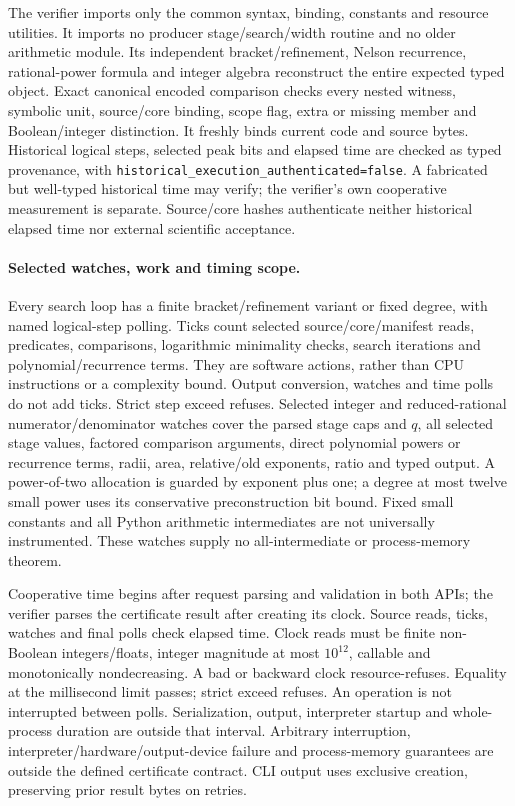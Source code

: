\documentclass[11pt]{article}
\theoremstyle{plain}
\theoremstyle{definition}
\theoremstyle{remark}
\begin{document}
The verifier imports only the common syntax, binding, constants and resource
utilities. It imports no producer stage/search/width routine and no older
arithmetic module. Its independent bracket/refinement, Nelson recurrence,
rational-power formula and integer algebra reconstruct the entire expected
typed object. Exact canonical encoded comparison checks every nested witness,
symbolic unit, source/core binding, scope flag, extra or missing member and
Boolean/integer distinction. It freshly binds current code and source bytes.
Historical logical steps, selected peak bits and elapsed time are checked as
typed provenance, with \texttt{historical\_execution\_authenticated=false}.
A fabricated but well-typed historical time may verify; the verifier's own
cooperative measurement is separate. Source/core hashes authenticate neither
historical elapsed time nor external scientific acceptance.

\paragraph{Selected watches, work and timing scope.}
Every search loop has a finite bracket/refinement variant or fixed degree,
with named logical-step polling. Ticks count selected source/core/manifest
reads, predicates, comparisons, logarithmic minimality checks, search
iterations and polynomial/recurrence terms. They are software actions,
rather than CPU instructions or a complexity bound. Output conversion,
watches and time polls do not add ticks. Strict step exceed refuses.
Selected integer and reduced-rational numerator/denominator watches cover
the parsed stage caps and $q$, all selected stage values, factored comparison
arguments, direct polynomial powers or recurrence terms, radii, area,
relative/old exponents, ratio and typed output. A power-of-two allocation is
guarded by exponent plus one; a degree at most twelve small power uses its
conservative preconstruction bit bound. Fixed small constants and all Python
arithmetic intermediates are not universally instrumented. These watches
supply no all-intermediate or process-memory theorem.

Cooperative time begins after request parsing and validation in both APIs;
the verifier parses the certificate result after creating its clock.
Source reads, ticks, watches and final polls check elapsed time. Clock reads
must be finite non-Boolean integers/floats, integer magnitude at most
$10^{12}$, callable and monotonically nondecreasing. A bad or backward clock
resource-refuses. Equality at the millisecond limit passes; strict exceed
refuses. An operation is not interrupted between polls. Serialization,
output, interpreter startup and whole-process duration are outside that
interval. Arbitrary interruption, interpreter/hardware/output-device failure
and process-memory guarantees are outside the defined certificate contract.
CLI output uses exclusive creation, preserving prior result bytes on retries.
\end{document}
